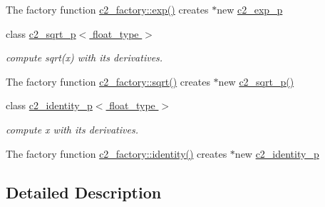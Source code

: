 \begin{DoxyCompactItemize}
\begin{DoxyCompactList}
The factory function \hyperlink{classc2__factory_ad6c29a455b386c1971e6614f6962f3da}{c2\-\_\-factory\-::exp()} creates $\ast$new \hyperlink{classc2__exp__p}{c2\-\_\-exp\-\_\-p} \end{DoxyCompactList}\item 
class \hyperlink{classc2__sqrt__p}{c2\-\_\-sqrt\-\_\-p$<$ float\-\_\-type $>$}
\begin{DoxyCompactList}\small\item\em compute sqrt(x) with its derivatives.

The factory function \hyperlink{classc2__factory_a5b189f66ec65267f3812cdc45ccf072d}{c2\-\_\-factory\-::sqrt()} creates $\ast$new \hyperlink{classc2__sqrt__p_a780a0f48a8fb428b2cb9fac74b7b56e7}{c2\-\_\-sqrt\-\_\-p()} \end{DoxyCompactList}\item 
class \hyperlink{classc2__identity__p}{c2\-\_\-identity\-\_\-p$<$ float\-\_\-type $>$}
\begin{DoxyCompactList}\small\item\em compute x with its derivatives.

The factory function \hyperlink{classc2__factory_a66970667d203c0e63a016b08d2472dc4}{c2\-\_\-factory\-::identity()} creates $\ast$new \hyperlink{classc2__identity__p}{c2\-\_\-identity\-\_\-p} \end{DoxyCompactList}\end{DoxyCompactItemize}


\subsection{Detailed Description}
